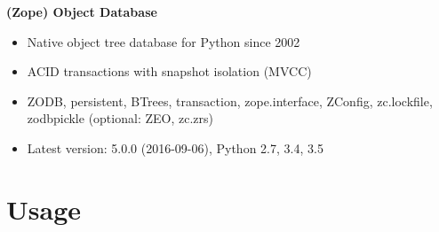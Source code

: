 \documentclass[aspectratio=169]{beamer}
\begin{document}


\begin{frame}[plain,t]
  \vspace{1.0cm}\par
  \Huge
  \bfseries
  \centering (Zope) Object Database
  \LARGE
  \vspace{1.0cm}\par
  \mdseries
  \begin{itemize}[label=--]
    \item Native object tree database for Python since 2002
    \item ACID transactions with snapshot isolation (MVCC)
    \item ZODB, persistent, BTrees, transaction, zope.interface, ZConfig, zc.lockfile, zodbpickle (optional: ZEO, zc.zrs)
    \item Latest version: 5.0.0 (2016-09-06), Python 2.7, 3.4, 3.5
  \end{itemize}
\end{frame}

\section{Usage}

{
%
\begin{frame}[plain,t]
  \vfill
  \centering
  \Huge
  \bfseries
  \lsstyle
\end{frame}
}
\end{document}
